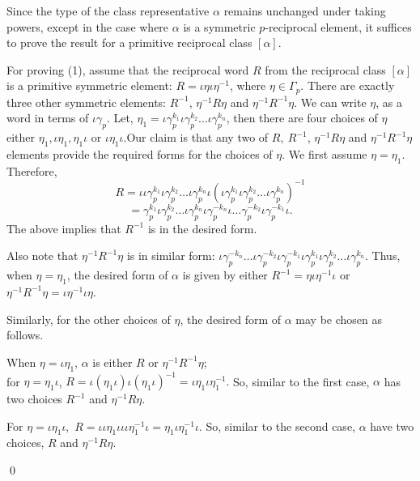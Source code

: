 \documentclass[11pt]{amsart}
\renewenvironment{proof}{{\bfseries Proof.}}{\qed}
\numberwithin{equation}{section}
\theoremstyle{definition}
\newcommand{\n}{\newline}
\newcommand{\g}{\gamma_{p}}
\newcommand{\io}{\iota }
\numberwithin{equation}{section}
\begin{document}
	\begin{proof} Since the type of the class representative $\alpha$ remains unchanged under taking powers, except in the case where $\alpha$ is a symmetric $p$-reciprocal element, it suffices to prove the result for a primitive reciprocal class $[\alpha]$.
		
		For proving (1), assume that the reciprocal word $ R $ from the reciprocal class $  [\alpha]$  is a primitive symmetric element:  $R=\io \eta \io\eta^{-1}$, where $ \eta \in \Gamma_p $. There are exactly three other symmetric elements: $R^{-1}$,  
		$ \eta^{-1} R\eta$ and $\eta^{-1} R^{-1}\eta$. We can write $ \eta $, as a word in terms of $ \io \g $. Let, $ \eta_{1}= \io\g^{k_{1}}\io\g^{k_{2}}\dots \io\g^{k_{n}}$, then there are four choices of $ \eta $ either $ \eta_{1}, \io\eta_{1}, \eta_{1}\io \text{ or } \io \eta_{1}\io. $\n Our claim is that any  two of $R,~R^{-1}$,  
		$ \eta^{-1} R\eta$ and $\eta^{-1} R^{-1}\eta$ elements provide the required forms for the choices of $\eta$. 
		We first assume $ \eta=\eta_{1} $. Therefore,  \[R=\io\io\g^{k_{1}}\io\g^{k_{2}}\dots \io\g^{k_{n}}\io (\io\g^{k_{1}}\io\g^{k_{2}}\dots \io\g^{k_{n}})^{-1}\]
		\[=\g^{k_{1}}\io\g^{k_{2}}\dots \io\g^{k_{n}}\io\g^{-k_{n}}\io\dots\g^{-k_{2}}\io\g^{-k_{1}}\io.\]
		The above implies that $R^{-1}$ is in the desired form. 
		
		Also note that $\eta ^{-1}R^{-1}\eta$ is in similar form: $\io \g^{-k_{n}}\dots\io  \g^{-k_{2}}\io \g^{-k_{1}}\io\g^{k_{1}}\io \g^{k_{2}}\dots \io \g^{k_{n}}$. Thus, when  $ \eta=\eta_{1} $, the desired form of $\alpha$ is given by  either $ R^{-1}=\eta\io\eta^{-1}\io $ or $ \eta^{-1}R^{-1}\eta  = \io\eta^{-1}\io\eta $.
		
		Similarly, for the other choices of $\eta$, the desired form of $\alpha$ may be chosen as follows.
		
		When $\eta=\io \eta_1$, $\alpha$ is either $R$ or $\eta^{-1} R^{-1}\eta$; 
		\\
		for $ \eta=\eta_{1}\io $, $ R=\io(\eta_{1}\io)\io(\eta_{1}\io)^{-1}=\io \eta_{1}\io\eta_{1}^{-1}. $ So, similar to the first case, $\alpha$ has two choices $ R^{-1} $ and $ \eta^{-1}R\eta $.
		
		For $ \eta=\io\eta_{1}\io, $ $ R=\io\io\eta_{1}\io\io\io\eta_{1}^{-1}\io=\eta_{1}\io\eta_{1}^{-1}\io .$ So, similar to the second case, $\alpha$ have two choices, $ R $ and $ \eta^{-1}R\eta. $
		

\end{proof}
\end{document}
